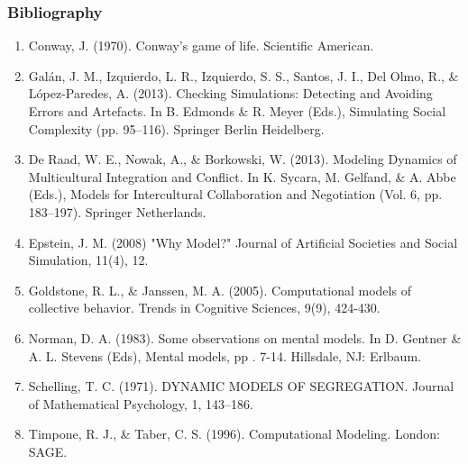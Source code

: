 \documentclass{beamer}
\begin{document}
\begin{frame}
   \frametitle{Bibliography}
   \scriptsize
   \begin{enumerate}
      \item Conway, J. (1970). Conway's game of life. Scientific American.
      \item Galán, J. M., Izquierdo, L. R., Izquierdo, S. S., Santos, J. I., Del
      Olmo, R., \& López-Paredes, A. (2013). Checking Simulations: Detecting and
      Avoiding Errors and Artefacts. In B. Edmonds \& R. Meyer (Eds.),
      Simulating Social Complexity (pp. 95–116). Springer Berlin Heidelberg.
      \item De Raad, W. E., Nowak, A., \& Borkowski, W. (2013). Modeling
      Dynamics of Multicultural Integration and Conflict. In K. Sycara, M.
      Gelfand, \& A. Abbe (Eds.), Models for Intercultural Collaboration and
      Negotiation (Vol. 6, pp. 183–197). Springer Netherlands.
      \item Epstein, J. M. (2008) "Why Model?" Journal of Artificial Societies and Social Simulation, 11(4), 12.
      \item Goldstone, R. L., \& Janssen, M. A. (2005). Computational models of collective behavior. Trends in Cognitive Sciences, 9(9), 424-430.
      \item Norman, D. A. (1983). Some observations on mental models. In D. Gentner \& A. L. Stevens (Eds), Mental models, pp . 7-14. Hillsdale, NJ: Erlbaum.
      \item Schelling, T. C. (1971). DYNAMIC MODELS OF SEGREGATION. Journal of
      Mathematical Psychology, 1, 143–186.
      \item Timpone, R. J., \& Taber, C. S. (1996). Computational Modeling. London: SAGE.
   \end{enumerate}
\end{frame}
\end{document}
